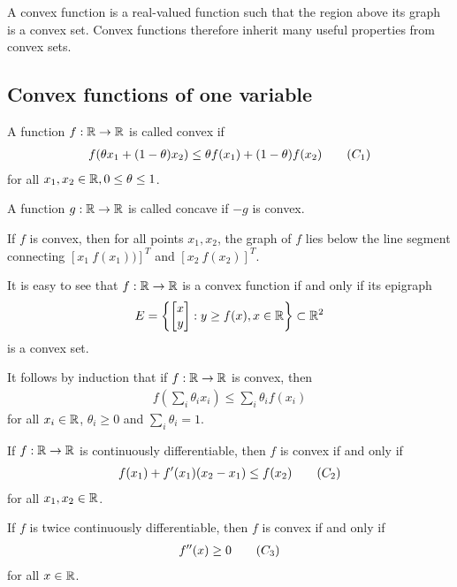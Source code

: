 A convex function is a real-valued function such that the region above its graph is a convex set.
Convex functions therefore inherit many useful properties from convex sets.

\subsection{Convex functions of one variable}

\begin{definition}
A function $f: \mathbb{R} \to \mathbb{R}$ is called convex if 
\begin{align}
f(\theta x_1 + (1-\theta) x_2) \le \theta f(x_1) + (1-\theta) f(x_2) \tag{$C_1$} \labeq{C1}
\end{align}
for all $x_1, x_2 \in \mathbb{R}, 0 \le \theta \le 1$.

A function $g: \mathbb{R} \to \mathbb{R}$ is called concave if $-g$ is convex.
\end{definition}

If $f$ is convex, then for all points $x_1, x_2$, the graph of $f$ lies below the line segment  connecting $[x_1 \ f(x_1))]^T$ and
$[x_2 \ f(x_2)]^T$.

It is easy to see that $f:\mathbb{R} \to \mathbb{R}$ is a convex function if and only if its epigraph
\begin{align}
E = \left\{ 
\begin{bmatrix}
x \\
y \\
\end{bmatrix} :
y \ge f(x), x \in \mathbb{R}
\right\} \subset \mathbb{R}^2
\end{align}
is a convex set.

\begin{remark}
It follows by induction that if $f: \mathbb{R} \to \mathbb{R}$ is convex, then
\begin{align}
f (\sum_{i} \theta_i x_i) \le \sum_{i} \theta_i f(x_i)
\end{align}
for all $x_i \in \mathbb{R}$, $\theta_i \ge 0$ and $\sum_{i} \theta_i = 1$.
\end{remark}

\begin{theorem}
If $f:\mathbb{R} \to \mathbb{R}$ is continuously differentiable, then $f$ is convex if and only if 
\begin{align}
f(x_1) + f'(x_1) (x_2 - x_1) \le f(x_2) \tag{$C_2$} \labeq{C2}
\end{align}
for all $x_1, x_2 \in \mathbb{R}$.

If $f$ is twice continuously differentiable, then $f$ is convex if and only if
\begin{align}
f''(x) \ge 0 \tag{$C_3$} \labeq{C3}
\end{align}
for all $x \in \mathbb{R}$.
\end{theorem}

